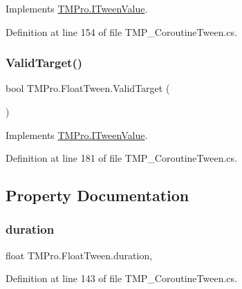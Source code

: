 Implements \mbox{\hyperlink{interface_t_m_pro_1_1_i_tween_value_aed9322f3d92691a29267b72c104b40bf}{T\+M\+Pro.\+I\+Tween\+Value}}.



Definition at line 154 of file T\+M\+P\+\_\+\+Coroutine\+Tween.\+cs.

\mbox{\label{struct_t_m_pro_1_1_float_tween_a3d09fd870431b55a0632db8da6356ee1}} 
\subsubsection{\texorpdfstring{ValidTarget()}{ValidTarget()}}
{\footnotesize\ttfamily bool T\+M\+Pro.\+Float\+Tween.\+Valid\+Target (\begin{DoxyParamCaption}{ }\end{DoxyParamCaption})}



Implements \mbox{\hyperlink{interface_t_m_pro_1_1_i_tween_value_ae0e763108b1d0fe8f9e34661a16fa994}{T\+M\+Pro.\+I\+Tween\+Value}}.



Definition at line 181 of file T\+M\+P\+\_\+\+Coroutine\+Tween.\+cs.



\subsection{Property Documentation}
\mbox{\label{struct_t_m_pro_1_1_float_tween_a1732506042e018ce35fda4cc017ebb73}} 
\subsubsection{\texorpdfstring{duration}{duration}}
{\footnotesize\ttfamily float T\+M\+Pro.\+Float\+Tween.\+duration\hspace{0.3cm}{\ttfamily [get]}, {\ttfamily [set]}}



Definition at line 143 of file T\+M\+P\+\_\+\+Coroutine\+Tween.\+cs.

\mbox{\label{struct_t_m_pro_1_1_float_tween_afb7dd396669aef918acda86f74ee2d33}} 
